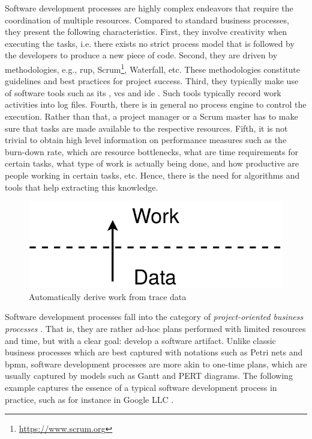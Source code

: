 
Software development processes are highly complex endeavors that require the coordination of multiple resources. Compared to standard business processes, they present the following characteristics. First, 
they involve creativity when executing the tasks, i.e. there exists no strict process model that is followed by the developers to produce a new piece of code. Second, they are driven by methodologies, e.g., \gls{rup}, Scrum\footnote{\url{https://www.scrum.org}}, Waterfall, etc. These methodologies constitute guidelines and best practices for project success. Third, they typically make use of software tools such as \gls{its} , \gls{vcs}  and \gls{ide} . Such tools typically record work activities into log files. Fourth, there is in general no process engine to control the execution. Rather than that, a project manager or a Scrum master has to make sure that tasks are made available to the respective resources. Fifth, it is not trivial to obtain high level information on performance measures such as the burn-down rate, which are resource bottlenecks, what are time requirements for certain tasks, what type of work is actually being done, and how productive are people working in certain tasks, etc. Hence, there is the need for algorithms and tools that help extracting this knowledge.

\begin{figure}
	\centering
	\includegraphics[width=0.4\linewidth]{figures/data-to-work}
	\caption{Automatically derive work from trace data}
	\label{fig:data-to-work}
\end{figure}


Software development processes fall into the category of \emph{project-oriented business processes} \citep{DBLP:conf/bpm/BalaCMRP15}. 
That is, they are rather ad-hoc plans performed with limited resources and time, but with a clear goal: develop a software artifact. Unlike classic business processes which are best captured with notations such as Petri nets and \gls{bpmn}, software development processes are more akin to one-time plans, which are usually captured by models such as Gantt and PERT diagrams. The following example captures the essence of a typical software development process in practice, such as for instance in Google LLC \citep{Henderson2017}.


